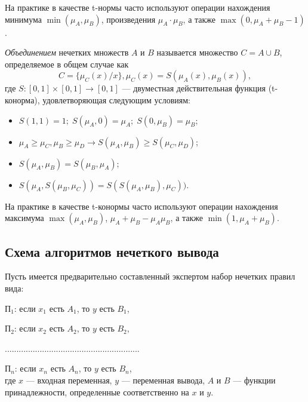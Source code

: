 На практике в качестве t-нормы часто используют операции
нахождения минимума \( \min(\mu_A, \mu_B ) \),
произведения \( \mu_A \cdot \mu_B \), а также
\( \max(0, \mu_A + \mu_B - 1) \).

\emph{Объединением} нечетких множеств \( A \) и \( B \) называется множество
\( C = A \cup B \), определяемое в общем случае как
\[ C = \{ \mu_C(x) / x \}, \mu_C(x) = S(\mu_A(x), \mu_B(x)), \]
где \( S: [0, 1] \times [0,1] \rightarrow [0, 1] \) ---
двуместная действительная функция (t-конорма), удовлетворяющая следующим условиям:
\begin{itemize}
\item \( S(1, 1) = 1; \; S(\mu_A, 0) = \mu_A; \; S(0, \mu_B) = \mu_B \);
\item \( \mu_A \ge \mu_C, \mu_B \ge \mu_D \rightarrow S(\mu_A, \mu_B) \ge S(\mu_C, \mu_D) \);
\item \( S(\mu_A, \mu_B) = S(\mu_B, \mu_A) \);
\item \( S(\mu_A, S(\mu_B, \mu_C)) = S(S(\mu_A, \mu_B), \mu_C)) \).
\end{itemize}

На практике в качестве t-конормы часто используют операции
нахождения максимума \( \max(\mu_A, \mu_B ) \),
\( \mu_A + \mu_B - \mu_A \mu_B \), а также
\( \min(1, \mu_A + \mu_B) \).

\pagebreak

\subsection{Схема алгоритмов нечеткого вывода}

Пусть имеется предварительно составленный экспертом набор нечетких правил вида: \par
\( \text{П}_1 \): если \( x_1 \) есть \( A_1 \), то \( y \) есть \( B_1 \), \par
\( \text{П}_2 \): если \( x_2 \) есть \( A_2 \), то \( y \) есть \( B_2 \), \par
..........................................................  \par
\( \text{П}_n \): если \( x_n \) есть \( A_n \), то \( y \) есть \( B_n \), \\
где \( x \) --- входная переменная,
\( y \) --- переменная вывода,
\( A \) и \( B \) --- функции принадлежности,
определенные соответственно на \( x \) и \( y \).

